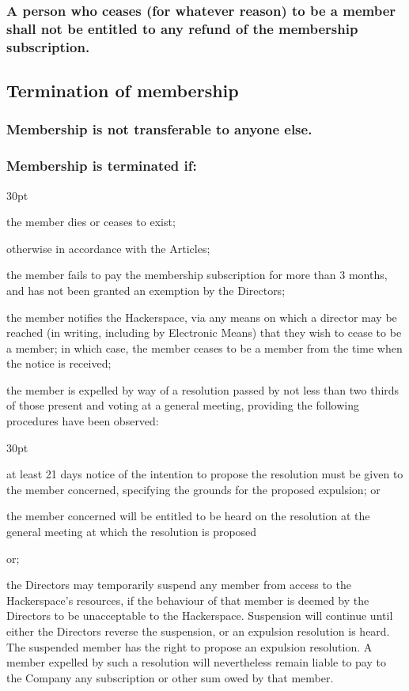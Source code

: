 \documentclass[12pt]{article}
\def\clauseindent{30pt}
\newenvironment{subindentpara}{\begin{adjustwidth}{\clauseindent}{}\begin{hanginglist}}{\end{hanginglist}\end{adjustwidth}}
\begin{document}
\subsubsection{A person who ceases (for whatever reason) to be a member shall not be entitled to any refund of the membership subscription.}

\subsection{Termination of membership}
\subsubsection{Membership is not transferable to anyone else.}
\subsubsection{Membership is terminated if:}
\begin{subindentpara}
    \item the member dies or ceases to exist;
    \item otherwise in accordance with the Articles;
    \item the member fails to pay the membership subscription for more than 3 months, and has not been granted an exemption by the Directors;
    \item the member notifies the Hackerspace, via any means on which a director may be reached (in writing, including by Electronic Means) that they wish to cease to be a member; in which case, the member ceases to be a member from the time when the notice is received;
    \item the member is expelled by way of a resolution passed by not less than two thirds of those present and voting at a general meeting, providing the following procedures have been observed: 
    \begin{subindentpara} %
        \item at least 21 days notice of the intention to propose the resolution must be given to the member concerned,  specifying the grounds for the proposed expulsion; or
        \item the member concerned will be entitled to be heard on the resolution at the general meeting at which the resolution is proposed
    \end{subindentpara}
    \item or;
    \item the Directors may temporarily suspend any member from access to the Hackerspace's resources, if the behaviour of that member is deemed by the Directors to be unacceptable to the Hackerspace. Suspension will continue until either the Directors reverse the suspension, or an expulsion resolution is heard. The suspended member has the right to propose an expulsion resolution. A member expelled by such a resolution will nevertheless remain liable to pay to the Company any subscription or other sum owed by that member.
\end{subindentpara}
\end{document}
